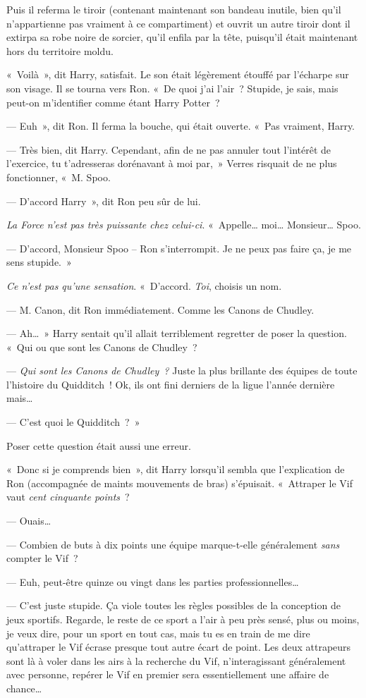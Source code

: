 Puis il referma le tiroir (contenant maintenant son bandeau inutile, bien qu'il n'appartienne pas vraiment à ce compartiment) et ouvrit un autre tiroir dont il extirpa sa robe noire de sorcier, qu'il enfila par la tête, puisqu'il était maintenant hors du territoire moldu.

«~Voilà~», dit Harry, satisfait. Le son était légèrement étouffé par l'écharpe sur son visage. Il se tourna vers Ron.  «~De quoi j'ai l'air~? Stupide, je sais, mais peut-on m'identifier comme étant Harry Potter~?

--- Euh~», dit Ron. Il ferma la bouche, qui était ouverte. «~Pas vraiment, Harry.

--- Très bien, dit Harry. Cependant, afin de ne pas annuler tout l'intérêt de l'exercice, tu t'adresseras dorénavant à moi par,~» Verres risquait de ne plus fonctionner, «~M. Spoo.

--- D'accord Harry~», dit Ron peu sûr de lui.

\emph{La Force n'est pas très puissante chez celui-ci}. «~Appelle… moi… Monsieur… Spoo.

--- D'accord, Monsieur Spoo -- Ron s'interrompit. Je ne peux pas faire ça, je me sens stupide.~»

\emph{Ce n'est pas qu'une sensation}. «~D'accord. \emph{Toi}, choisis un nom.

--- M. Canon, dit Ron immédiatement. Comme les Canons de Chudley.

--- Ah…~» Harry sentait qu'il allait terriblement regretter de poser la question. «~Qui ou que sont les Canons de Chudley~?

--- \emph{Qui sont les Canons de Chudley~?} Juste la plus brillante des équipes de toute l'histoire du Quidditch~! Ok, ils ont fini derniers de la ligue l'année dernière mais…

--- C'est quoi le Quidditch~?~»

Poser cette question était aussi une erreur.

«~Donc si je comprends bien~», dit Harry lorsqu'il sembla que l'explication de Ron (accompagnée de maints mouvements de bras) s'épuisait. «~Attraper le Vif vaut \emph{cent cinquante points}~?

--- Ouais…

--- Combien de buts à dix points une équipe marque-t-elle généralement \emph{sans} compter le Vif~?

--- Euh, peut-être quinze ou vingt dans les parties professionnelles…

--- C'est juste stupide. Ça viole toutes les règles possibles de la conception de jeux sportifs.
Regarde, le reste de ce sport a l'air à peu près sensé, plus ou moins, je veux dire, pour un sport en tout cas, mais tu es en train de me dire qu'attraper le Vif écrase presque tout autre écart de point.
Les deux attrapeurs sont là à voler dans les airs à la recherche du Vif, n'interagissant généralement avec personne, repérer le Vif en premier sera essentiellement une affaire de chance…

